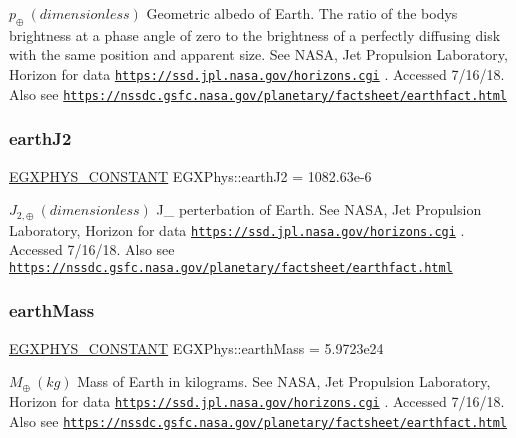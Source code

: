 $ p_{\oplus} \ (dimensionless)$ Geometric albedo of Earth. The ratio of the body\textquotesingle{}s brightness at a phase angle of zero to the brightness of a perfectly diffusing disk with the same position and apparent size. See N\+A\+SA, Jet Propulsion Laboratory, Horizon for data \href{https://ssd.jpl.nasa.gov/horizons.cgi}{\tt https\+://ssd.\+jpl.\+nasa.\+gov/horizons.\+cgi} . Accessed 7/16/18. Also see \href{https://nssdc.gsfc.nasa.gov/planetary/factsheet/earthfact.html}{\tt https\+://nssdc.\+gsfc.\+nasa.\+gov/planetary/factsheet/earthfact.\+html} \mbox{\label{group___e_g_x_phys-_constants-_astrophysics-_solar_system-_earth-_bulk_ga8d661a52948229a59e9eabf97af51faf}} 
\subsubsection{\texorpdfstring{earth\+J2}{earthJ2}}
{\footnotesize\ttfamily \mbox{\hyperlink{group___e_g_x_phys-_constants-_macros_ga76980d288494ce1714c9ac68a95ba702}{E\+G\+X\+P\+H\+Y\+S\+\_\+\+C\+O\+N\+S\+T\+A\+NT}} E\+G\+X\+Phys\+::earth\+J2 = 1082.\+63e-\/6}

$ J_{2,\oplus} \ (dimensionless)$ J\+\_ perterbation of Earth. See N\+A\+SA, Jet Propulsion Laboratory, Horizon for data \href{https://ssd.jpl.nasa.gov/horizons.cgi}{\tt https\+://ssd.\+jpl.\+nasa.\+gov/horizons.\+cgi} . Accessed 7/16/18. Also see \href{https://nssdc.gsfc.nasa.gov/planetary/factsheet/earthfact.html}{\tt https\+://nssdc.\+gsfc.\+nasa.\+gov/planetary/factsheet/earthfact.\+html} \mbox{\label{group___e_g_x_phys-_constants-_astrophysics-_solar_system-_earth-_bulk_ga7d335a700fce4dda5baa19d2b2ed14ba}} 
\subsubsection{\texorpdfstring{earth\+Mass}{earthMass}}
{\footnotesize\ttfamily \mbox{\hyperlink{group___e_g_x_phys-_constants-_macros_ga76980d288494ce1714c9ac68a95ba702}{E\+G\+X\+P\+H\+Y\+S\+\_\+\+C\+O\+N\+S\+T\+A\+NT}} E\+G\+X\+Phys\+::earth\+Mass = 5.\+9723e24}

$M_{\oplus} \ (kg)$ Mass of Earth in kilograms. See N\+A\+SA, Jet Propulsion Laboratory, Horizon for data \href{https://ssd.jpl.nasa.gov/horizons.cgi}{\tt https\+://ssd.\+jpl.\+nasa.\+gov/horizons.\+cgi} . Accessed 7/16/18. Also see \href{https://nssdc.gsfc.nasa.gov/planetary/factsheet/earthfact.html}{\tt https\+://nssdc.\+gsfc.\+nasa.\+gov/planetary/factsheet/earthfact.\+html} \mbox{\label{group___e_g_x_phys-_constants-_astrophysics-_solar_system-_earth-_bulk_ga4b3a512e9d562530710100f65695ab13}} 
